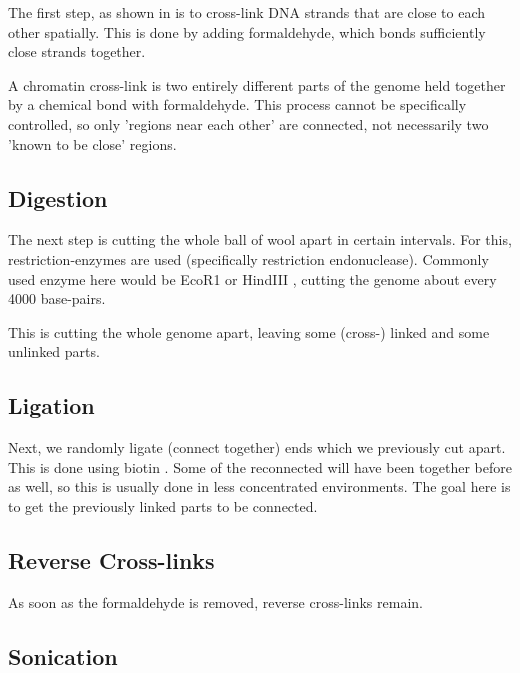 The first step, as shown in  is to cross-link DNA strands that
are close to each other spatially. This is done by adding formaldehyde, which
bonds sufficiently close strands together.

A chromatin cross-link is two entirely different parts of the genome held
together by a chemical bond with formaldehyde. This process cannot be
specifically controlled, so only 'regions near each other' are connected, not
necessarily two 'known to be close' regions.

\subsection{Digestion}

The next step is cutting the whole ball of wool apart in certain intervals. For
this, restriction-enzymes are used (specifically restriction endonuclease).
Commonly used enzyme here would be EcoR1 or HindIII , cutting the genome about every 4000 base-pairs.

This is cutting the whole genome apart, leaving some (cross-) linked and some unlinked parts.

\subsection{Ligation}

Next, we randomly ligate (connect together) ends which we previously cut apart.
This is done using biotin .
Some of the reconnected will have been together before as well, so this is
usually done in less concentrated environments. The goal here is to get the
previously linked parts to be connected.

\subsection{Reverse Cross-links}

As soon as the formaldehyde is removed, reverse cross-links remain.

\subsection{Sonication}


